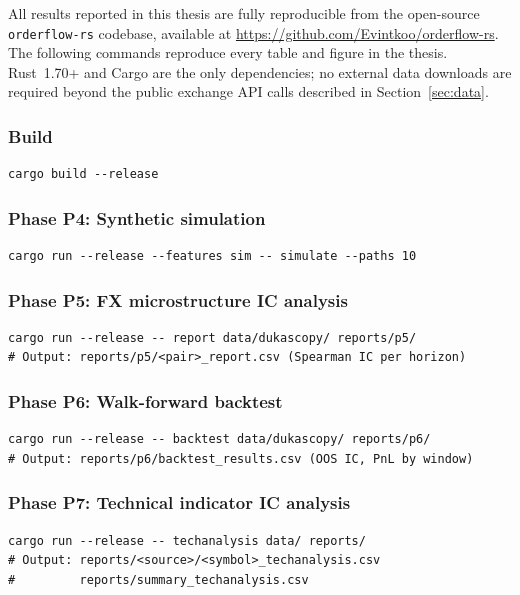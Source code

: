 \documentclass[12pt,a4paper]{article}
\theoremstyle{definition}
\theoremstyle{remark}
\newcommand{\code}[1]{\texttt{\small #1}}
\begin{document}
All results reported in this thesis are fully reproducible from the
open-source \code{orderflow-rs} codebase, available at
\url{https://github.com/Evintkoo/orderflow-rs}.
The following commands reproduce every table and figure in the thesis.
Rust~1.70+ and Cargo are the only dependencies; no external data
downloads are required beyond the public exchange API calls described
in Section~\ref{sec:data}.

\subsubsection*{Build}
\begin{verbatim}
cargo build --release
\end{verbatim}

\subsubsection*{Phase P4: Synthetic simulation}
\begin{verbatim}
cargo run --release --features sim -- simulate --paths 10
\end{verbatim}

\subsubsection*{Phase P5: FX microstructure IC analysis}
\begin{verbatim}
cargo run --release -- report data/dukascopy/ reports/p5/
# Output: reports/p5/<pair>_report.csv (Spearman IC per horizon)
\end{verbatim}

\subsubsection*{Phase P6: Walk-forward backtest}
\begin{verbatim}
cargo run --release -- backtest data/dukascopy/ reports/p6/
# Output: reports/p6/backtest_results.csv (OOS IC, PnL by window)
\end{verbatim}

\subsubsection*{Phase P7: Technical indicator IC analysis}
\begin{verbatim}
cargo run --release -- techanalysis data/ reports/
# Output: reports/<source>/<symbol>_techanalysis.csv
#         reports/summary_techanalysis.csv
\end{verbatim}
\end{document}
